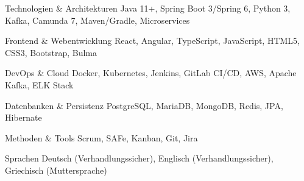 


\begin{cvskills}


\cvskill
{Technologien \& Architekturen}
{Java 11+, Spring Boot 3/Spring 6, Python 3, Kafka, Camunda 7, Maven/Gradle, Microservices}


\cvskill
{Frontend \& Webentwicklung}
{React, Angular, TypeScript, JavaScript, HTML5, CSS3, Bootstrap, Bulma}


\cvskill
{DevOps \& Cloud}
{Docker, Kubernetes, Jenkins, GitLab CI/CD, AWS, Apache Kafka, ELK Stack}


\cvskill
{Datenbanken \& Persistenz}
{PostgreSQL, MariaDB, MongoDB, Redis, JPA, Hibernate}


\cvskill
{Methoden \& Tools}
{Scrum, SAFe, Kanban, Git, Jira}


\cvskill
{Sprachen}
{Deutsch (Verhandlungssicher), Englisch (Verhandlungssicher), Griechisch (Muttersprache)}



\end{cvskills}